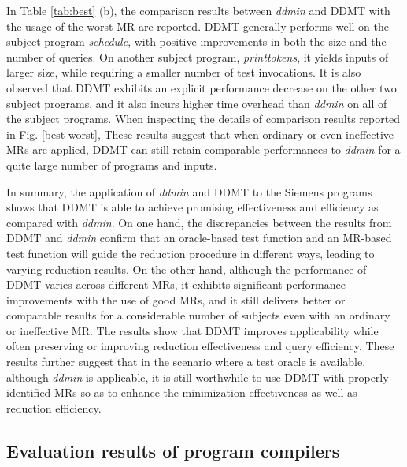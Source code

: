 In Table \ref{tab:best} (b), the comparison results between \emph{ddmin} and DDMT with the usage of the worst MR are reported.
DDMT generally performs well on the subject program \emph{schedule}, with positive improvements in both the size and the number of queries.
On another subject program, \emph{printtokens}, it yields inputs of larger size, while requiring a smaller number of test invocations.
It is also observed that DDMT exhibits an explicit performance decrease on the other two subject programs, and it also incurs higher time overhead than \emph{ddmin} on all of the subject programs.
When inspecting the details of comparison results reported in Fig. \ref{best-worst}, 
These results suggest that when ordinary or even ineffective MRs are applied, DDMT can still retain comparable performances to \emph{ddmin} for a quite large number of programs and inputs.









In summary, the application of \emph{ddmin} and DDMT to the Siemens programs shows that DDMT is able to achieve promising effectiveness and efficiency as compared with \emph{ddmin}.
On one hand, the discrepancies between the results from DDMT and \emph{ddmin} confirm that an oracle-based test function and an MR-based test function will guide the reduction procedure in different ways, leading to varying reduction results.
On the other hand, although the performance of DDMT varies across different MRs, it exhibits significant performance improvements with the use of good MRs, and it still delivers better or comparable results for a considerable number of subjects even with an ordinary or ineffective MR. 
The results show that DDMT improves applicability while often preserving or improving reduction effectiveness and query efficiency.
These results further suggest that in the scenario where a test oracle is available, although \emph{ddmin} is applicable, it is still worthwhile to use DDMT with properly identified MRs so as to enhance the minimization effectiveness as well as reduction efficiency.

\subsection{Evaluation results of program compilers}


